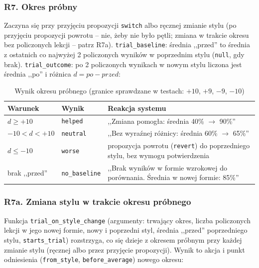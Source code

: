 \subsubsection{R7. Okres próbny}
Zaczyna się przy przyjęciu propozycji \texttt{switch} albo ręcznej zmianie stylu (po przyjęciu propozycji powrotu -- nie, żeby nie było pętli; zmiana w trakcie okresu bez policzonych lekcji -- patrz R7a). \texttt{trial\_baseline}: średnia ,,przed'' to średnia z ostatnich co najwyżej 2 policzonych wyników w poprzednim stylu (\texttt{null}, gdy brak). \texttt{trial\_outcome}: po 2 policzonych wynikach w nowym stylu liczona jest średnia ,,po'' i różnica $d = \textit{po} - \textit{przed}$:

\begin{table}[H]
\centering
\begin{tabular}{|l|l|p{7.2cm}|}
\hline
\textbf{Warunek} & \textbf{Wynik} & \textbf{Reakcja systemu} \\ \hline
$d \geq +10$ & \texttt{helped} & ,,Zmiana pomogła: średnia 40\% $\to$ 90\%'' \\ \hline
$-10 < d < +10$ & \texttt{neutral} & ,,Bez wyraźnej różnicy: średnia 60\% $\to$ 65\%'' \\ \hline
$d \leq -10$ & \texttt{worse} & propozycja powrotu (\texttt{revert}) do poprzedniego stylu, bez wymogu potwierdzenia \\ \hline
brak ,,przed'' & \texttt{no\_baseline} & ,,Brak wyników w formie wzrokowej do porównania. Średnia w nowej formie: 85\%'' \\ \hline
\end{tabular}
\caption{Wynik okresu próbnego (granice sprawdzane w testach: $+10$, $+9$, $-9$, $-10$)}
\end{table}

\subsubsection{R7a. Zmiana stylu w trakcie okresu próbnego}
Funkcja \texttt{trial\_on\_style\_change} (argumenty: trwający okres, liczba policzonych lekcji w jego nowej formie, nowy i poprzedni styl, średnia ,,przed'' poprzedniego stylu, \texttt{starts\_trial}) rozstrzyga, co się dzieje z okresem próbnym przy każdej zmianie stylu (ręcznej albo przez przyjęcie propozycji). Wynik to akcja i punkt odniesienia (\texttt{from\_style}, \texttt{before\_average}) nowego okresu:

